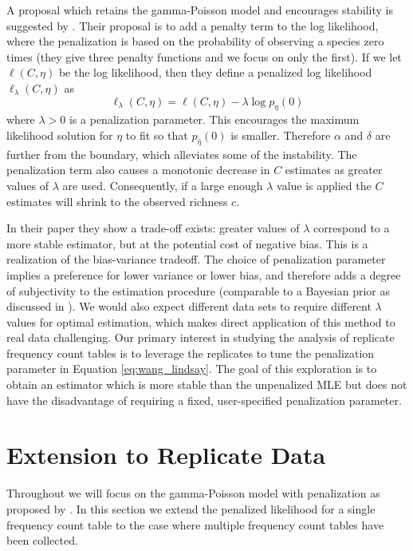 \documentclass[oupdraft]{bio}
\begin{document}
A proposal which retains the gamma-Poisson model and encourages stability is suggested by \citet{wang_2005}.  Their proposal is to add a penalty term to the log likelihood, where the penalization is based on the probability of observing a species zero times (they give three penalty functions and we focus on only the first).  If we let $\ell(C,\eta)$ be the log likelihood, then they define a penalized log likelihood $\ell_{\lambda}(C, \eta)$ as
\begin{equation}
\ell_\lambda(C, \eta) = \ell(C,\eta) - \lambda \log p_{\eta}(0)
\label{eq:wang_lindsay}
\end{equation}
where $\lambda > 0$ is a penalization parameter.  This encourages the maximum likelihood solution for $\eta$ to fit so that $p_{\widehat{\eta}}(0)$ is smaller.  Therefore $\alpha$ and $\delta$ are further from the boundary, which alleviates some of the instability. The penalization term also causes a monotonic decrease in $C$ estimates as greater values of $\lambda$ are used.  Consequently, if a large enough $\lambda$ value is applied the $C$ estimates will shrink to the observed richness $c$.

In their paper they show a trade-off exists: greater values of $\lambda$ correspond to a more stable estimator, but at the potential cost of negative bias.  This is a realization of the bias-variance tradeoff.
The choice of penalization parameter implies a preference for lower variance or lower bias, and therefore adds a degree of subjectivity to the estimation procedure (comparable to a Bayesian prior as discussed in \citet{wang_2005}).  We would also expect different data sets to require different $\lambda$ values for optimal estimation, which makes direct application of this method to real data challenging.  Our primary interest in studying the analysis of replicate frequency count tables is to leverage the replicates to tune the penalization parameter in Equation \ref{eq:wang_lindsay}.  The goal of this exploration is to obtain an estimator which is more stable than the unpenalized MLE but does not have the disadvantage of requiring a fixed, user-specified penalization parameter.


\section{Extension to Replicate Data}
\label{sec:fixed_lambda}

Throughout we will focus on the gamma-Poisson model with penalization as proposed by \citet{wang_2005}.  In this section we extend the penalized likelihood for a single frequency count table to the case where multiple frequency count tables have been collected.
\end{document}
